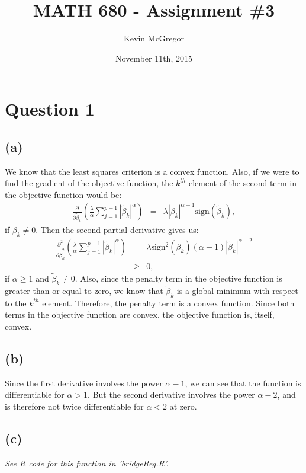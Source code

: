 \documentclass{article}\usepackage[]{graphicx}\usepackage[]{color}
\title{MATH 680 - Assignment \#3}
\author{Kevin McGregor}
\date{November 11th, 2015}
\begin{document}
\maketitle

\newcommand{\tb}{\tilde{\beta}}
\newcommand{\sign}{\mbox{sign}}

\section*{Question 1}
\subsection*{(a)}
We know that the least squares criterion is a convex function.  Also, if we were to find the gradient of the objective function, the $k^{th}$ element of the second term in the objective function would be:
\begin{eqnarray*}
  \frac{\partial}{\partial\tb_k} \left( \frac{\lambda}{\alpha} \sum_{j=1}^{p-1} |\tb_k|^\alpha \right) &=& \lambda |\tb_k|^{\alpha-1}\sign(\tb_k),
\end{eqnarray*}
if $\tb_k \neq 0$.  Then the second partial derivative gives us:
\begin{eqnarray*}
  \frac{\partial^2}{\partial\tb_k^2} \left( \frac{\lambda}{\alpha} \sum_{j=1}^{p-1} |\tb_k|^\alpha \right) &=& \lambda \sign^2(\tb_k)(\alpha-1) |\tb_k|^{\alpha-2} \\
        &\geq& 0,
\end{eqnarray*}
if $\alpha \geq 1$ and $\tb_k \neq 0$.  Also, since the penalty term in the objective function is greater than or equal to zero, we know that $\tb_k$ is a global minimum with respect to the $k^{th}$ element.  Therefore, the penalty term is a convex function.  Since both terms in the objective function are convex, the objective function is, itself, convex.

\subsection*{(b)}
Since the first derivative involves the power $\alpha-1$, we can see that the function is differentiable for $\alpha>1$.  But the second derivative involves the power $\alpha-2$, and is therefore not twice differentiable for $\alpha<2$ at zero.

\subsection*{(c)}
\emph{See R code for this function in 'bridgeReg.R'.}
\end{document}
